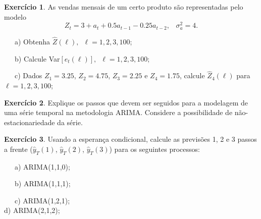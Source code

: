 \documentclass[
]{book}
\theoremstyle{definition}
\theoremstyle{definition}
\theoremstyle{definition}
\newtheorem{exercise}{Exercício}[chapter]
\theoremstyle{remark}
\begin{document}
\begin{exercise}
\protect\hypertarget{exr:exema2}{}{\label{exr:exema2} }As vendas mensais de um certo produto são representadas pelo modelo
\[Z_t=3+a_t+0.5a_{t-1}-0.25a_{t-2}, \,\,\,\,\,\sigma_a^2=4.\]

~~~a) Obtenha \(\hat{Z}(\ell), \,\,\,\ell=1,2,3,100\);

~~~b) Calcule Var\([e_t(\ell)], \,\,\,\ell=1,2,3,100\);

~~~c) Dados \(Z_1=3.25\), \(Z_2=4.75\), \(Z_3=2.25\) e \(Z_4=1.75\), calcule \(\hat{Z}_4(\ell)\) para \(\ell=1,2,3,100\);
\end{exercise}

\begin{exercise}
\protect\hypertarget{exr:exestarima}{}{\label{exr:exestarima} }Explique os passos que devem ser seguidos para a modelagem de uma série temporal na metodologia ARIMA. Considere a possibilidade de não-estacionariedade da série.
\end{exercise}

\begin{exercise}
\protect\hypertarget{exr:exerarima}{}{\label{exr:exerarima} }Usando a esperança condicional, calcule as previsões 1, 2 e 3 passos a frente (\(\widehat{y}_T(1)\), \(\widehat{y}_T(2)\), \(\widehat{y}_T (3)\)) para os seguintes processos:

~~~a) ARIMA(1,1,0);

~~~b) ARIMA(1,1,1);

~~~c) ARIMA(1,2,1);\\
\hspace*{0.333em}\hspace*{0.333em}\hspace*{0.333em}d) ARIMA(2,1,2);
\end{exercise}
\end{document}
